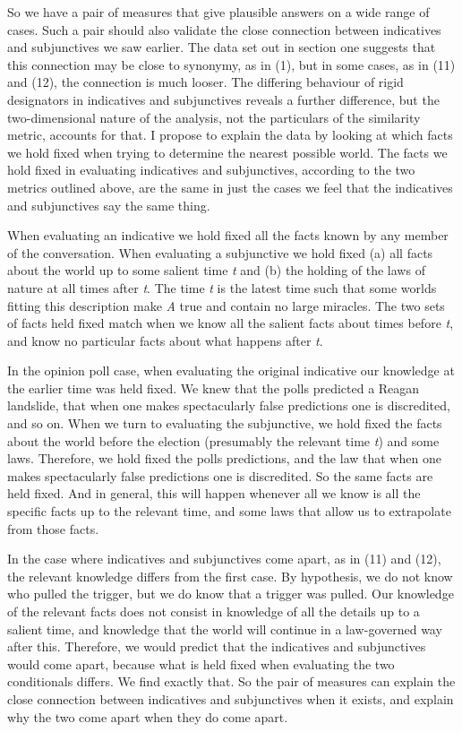 \documentclass[
  11pt,
  letterpaper,
  DIV=11,
  numbers=noendperiod,
  twoside]{scrartcl}
\begin{document}
So we have a pair of measures that give plausible answers on a wide
range of cases. Such a pair should also validate the close connection
between indicatives and subjunctives we saw earlier. The data set out in
section one suggests that this connection may be close to synonymy, as
in (1), but in some cases, as in (11) and (12), the connection is much
looser. The differing behaviour of rigid designators in indicatives and
subjunctives reveals a further difference, but the two-dimensional
nature of the analysis, not the particulars of the similarity metric,
accounts for that. I propose to explain the data by looking at which
facts we hold fixed when trying to determine the nearest possible world.
The facts we hold fixed in evaluating indicatives and subjunctives,
according to the two metrics outlined above, are the same in just the
cases we feel that the indicatives and subjunctives say the same thing.

When evaluating an indicative we hold fixed all the facts known by any
member of the conversation. When evaluating a subjunctive we hold fixed
(a) all facts about the world up to some salient time \emph{t} and (b)
the holding of the laws of nature at all times after \emph{t}. The time
\emph{t} is the latest time such that some worlds fitting this
description make \emph{A} true and contain no large miracles. The two
sets of facts held fixed match when we know all the salient facts about
times before \emph{t}, and know no particular facts about what happens
after \emph{t}.

In the opinion poll case, when evaluating the original indicative our
knowledge at the earlier time was held fixed. We knew that the polls
predicted a Reagan landslide, that when one makes spectacularly false
predictions one is discredited, and so on. When we turn to evaluating
the subjunctive, we hold fixed the facts about the world before the
election (presumably the relevant time \emph{t}) and some laws.
Therefore, we hold fixed the polls predictions, and the law that when
one makes spectacularly false predictions one is discredited. So the
same facts are held fixed. And in general, this will happen whenever all
we know is all the specific facts up to the relevant time, and some laws
that allow us to extrapolate from those facts.

In the case where indicatives and subjunctives come apart, as in (11)
and (12), the relevant knowledge differs from the first case. By
hypothesis, we do not know who pulled the trigger, but we do know that a
trigger was pulled. Our knowledge of the relevant facts does not consist
in knowledge of all the details up to a salient time, and knowledge that
the world will continue in a law-governed way after this. Therefore, we
would predict that the indicatives and subjunctives would come apart,
because what is held fixed when evaluating the two conditionals differs.
We find exactly that. So the pair of measures can explain the close
connection between indicatives and subjunctives when it exists, and
explain why the two come apart when they do come apart.
\end{document}
